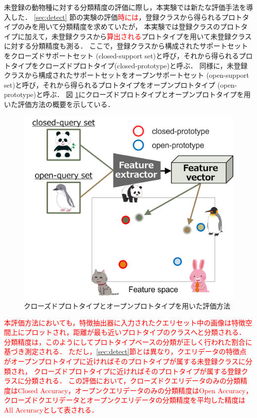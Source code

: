 \documentclass[a4paper,11pt,nomag]{jsreport}
\begin{document}
未登録の動物種に対する分類精度の評価に際し，本実験では新たな評価手法を導入した．
\ref{sec:detect} 節の実験の評価\textcolor{red}{時には}，登録クラスから得られるプロトタイプのみを用いて分類精度を求めていたが，
本実験では登録クラスのプロトタイプに加えて，未登録クラスから\textcolor{red}{算出される}プロトタイプを用いて未登録クラスに対する分類精度も測る．
ここで，登録クラスから構成されたサポートセットをクローズドサポートセット (closed-support set)と呼び，それから得られるプロトタイプをクローズドプロトタイプ(closed-prototype)と呼ぶ．
同様に，未登録クラスから構成されたサポートセットをオープンサポートセット (open-support set)と呼び，それから得られるプロトタイプをオープンプロトタイプ (open-prototype)と呼ぶ．
図 \ref{fig:openprototype}にクローズドプロトタイプとオープンプロトタイプを用いた評価方法の概要を示している．
% 
\begin{figure}[tbp]
  \centering
  \includegraphics[width=0.8\linewidth, keepaspectratio]{image/open-prototype.png}
  \caption{クローズドプロトタイプとオープンプロトタイプを用いた評価方法}
  \label{fig:openprototype}
\end{figure}
% 
\textcolor{red}{本評価方法においても，特徴抽出器に入力されたクエリセット中の画像は特徴空間上にプロットされ，距離が最も近いプロトタイプのクラスへと分類される．
分類精度は，このようにしてプロトタイプベースの分類が正しく行われた割合に基づき測定される．
ただし，\ref{sec:detect}節とは異なり，クエリデータの特徴点がオープンプロトタイプに近ければそのプロトタイプが属する未登録クラスに分類され，
クローズドプロトタイプに近ければそのプロトタイプが属する登録クラスに分類される．
この評価において，クローズドクエリデータのみの分類精度はClosed Accuracy，オープンクエリデータのみの分類精度はOpen Accuracy，
クローズドクエリデータとオープンクエリデータの分類精度を平均した精度はAll Accuracyとして表される．}
\end{document}
